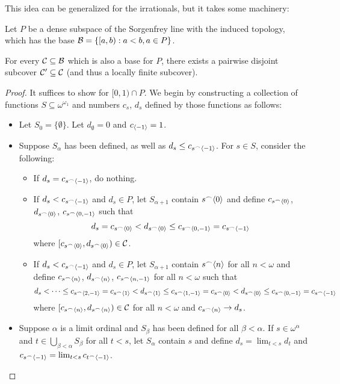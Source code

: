 This idea can be generalized for the irrationals, but it takes some machinery:

\begin{theorem}
Let $P$ be a dense subspace of the Sorgenfrey line with the induced topology, which has the base $\mathcal{B} = \{[a,b) : a<b, a\in P\}$.

For every $\mathcal{C}\subseteq\mathcal{B}$ which is also a base for $P$, there exists a pairwise disjoint subcover $\mathcal{C}'\subseteq\mathcal{C}$ (and thus a locally finite subcover).
\end{theorem}
\newpage
\begin{proof}
It suffices to show for $[0,1)\cap P$. We begin by constructing a collection of functions $S\subseteq \omega^{\omega_1}$ and numbers $c_s$, $d_s$ defined by those functions as follows:
  \begin{itemize}
    \item Let $S_0 = \{\emptyset\}$. Let $d_{\emptyset}=0$ and $c_{\langle-1\rangle}=1$.
    \item Suppose $S_\alpha$ has been defined, as well as $d_s\leq c_{s^\frown\langle-1\rangle}$. For $s\in S$, consider the following:
      \begin{itemize}
        \item If $d_s = c_{s^\frown\langle-1\rangle}$, do nothing.
        \item If $d_s < c_{s^\frown\langle-1\rangle}$ and $d_s\in P$, let $S_{\alpha+1}$ contain $s^\frown\langle0\rangle$ and define $c_{s^\frown\langle0\rangle}$, $d_{s^\frown\langle0\rangle}$, $c_{s^\frown\langle0,-1\rangle}$ such that 
          \[
            d_s = c_{s^\frown\langle0\rangle} < d_{s^\frown\langle0\rangle} \leq c_{s^\frown\langle0,-1\rangle} = c_{s^\frown\langle-1\rangle}
          \]
        where $[c_{s^\frown\langle0\rangle}, d_{s^\frown\langle0\rangle})\in \mathcal{C}$.
        \item If $d_s < c_{s^\frown\langle-1\rangle}$ and $d_s\in P$, let $S_{\alpha+1}$ contain $s^\frown\langle n\rangle$ for all $n<\omega$ and define $c_{s^\frown\langle n\rangle}$, $d_{s^\frown\langle n\rangle}$, $c_{s^\frown\langle n,-1\rangle}$ for all $n<\omega$ such that
          \[
            d_s < \dots \leq c_{s^\frown\langle2,-1\rangle} = c_{s^\frown\langle1\rangle} < d_{s^\frown\langle1\rangle} \leq c_{s^\frown\langle1,-1\rangle} = c_{s^\frown\langle0\rangle} < d_{s^\frown\langle0\rangle} \leq c_{s^\frown\langle0,-1\rangle} = c_{s^\frown\langle-1\rangle}
          \]
        where $[c_{s^\frown\langle n\rangle}, d_{s^\frown\langle n\rangle})\in \mathcal{C}$ for all $n<\omega$ and $c_{s^\frown\langle n\rangle} \rightarrow d_s$.
      \end{itemize}
    \item Suppose $\alpha$ is a limit ordinal and $S_\beta$ has been defined for all $\beta<\alpha$. If $s\in\omega^\alpha$ and $t\in \bigcup_{\beta<\alpha}S_\beta$ for all $t<s$, let $S_\alpha$ contain $s$ and define $d_s = \lim_{t<s}d_t$ and $c_{s^\frown\langle-1\rangle} = \lim_{t<s} c_{t^\frown\langle-1\rangle}$.
  \end{itemize}


\end{proof}
